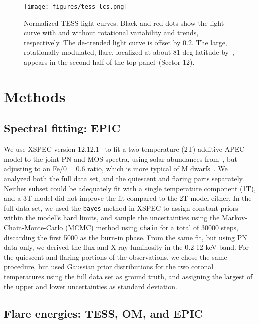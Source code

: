 \documentclass[twocolumn]{aastex631}
\begin{document}
\begin{figure*}
    \begin{centering}
        \texttt{[image: figures/tess\_lcs.png]}
        \caption{
         Normalized TESS light curves. Black and red dots show the light curve with and without rotational variability and trends, respectively. The de-trended light curve is offset by $0.2$. The large, rotationally modulated, flare, localized at about 81 deg latitude by~\citet{ilin2021giant}, appears in the second half of the top panel~(Sector 12).}
        \label{fig:tess_lcs}
    \end{centering}
\end{figure*}


\section{Methods}
\label{sec:methods}


\subsection{Spectral fitting: EPIC}
\label{sec:methods:epic}
We use XSPEC version 12.12.1~\citep{arnaud1996xspec} to fit a two-temperature (2T) additive APEC~\citep{smith2001collisional,foster2012updated} model to the joint PN and MOS spectra, using solar abundances from~\citet{grevesse1998standard}, but adjusting to an Fe/0$=0.6$ ratio, which is more typical of M dwarfs~\citep{wood2018chandra}. We analyzed both the full data set, and the quiescent and flaring parts separately. Neither subset could be adequately fit with a single temperature component (1T), and a 3T model did not improve the fit compared to the 2T-model either. In the full data set, we used the \texttt{bayes} method in XSPEC to assign constant priors within the model's hard limits, and sample the uncertainties using the Markov-Chain-Monte-Carlo (MCMC) method using \texttt{chain} for a total of 30000 steps, discarding the first 5000 as the burn-in phase. From the same fit, but using PN data only, we derived the flux and X-ray luminosity in the 0.2-12 keV band. For the quiescent and flaring portions of the observations, we chose the same procedure, but used Gaussian prior distributions for the two coronal temperatures using the full data set as ground truth, and assigning the largest of the upper and lower uncertainties as standard deviation.

\subsection{Flare energies: TESS, OM, and EPIC}
\end{document}
